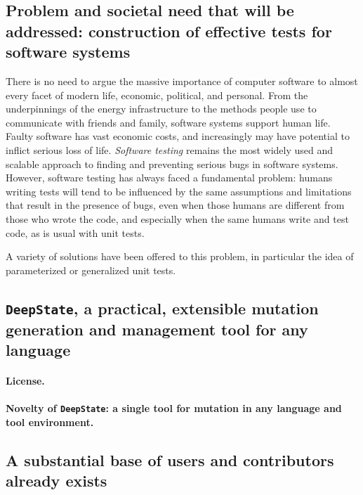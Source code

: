 \documentclass[numbers]{proposalnsf}
\newcommand{\ds}{\texttt{DeepState}}
\begin{document}
\vspace{-2mm}\subsection{Problem and societal need that will be addressed: construction of effective tests for software systems}

There is no need to argue the massive importance of computer software to almost every facet of modern life, economic, political, and personal.  From the underpinnings of the energy infrastructure to the methods people use to communicate with friends and family, software systems support human life.  Faulty software has vast economic costs, and increasingly may have potential to inflict serious loss of life.  \emph{Software testing} remains the most widely used and scalable approach to finding and preventing serious bugs in software systems.  However, software testing has always faced a fundamental problem: humans writing tests will tend to be influenced by the same assumptions and limitations that result in the presence of bugs, even when those humans are different from those who wrote the code, and especially when the same humans write and test code, as is usual with unit tests.

A variety of solutions have been offered to this problem, in particular the idea of parameterized or generalized unit tests.  


\subsection{\ds,  a practical, extensible mutation generation and management tool for any language}



\paragraph{License.}

\paragraph{Novelty of \ds: a single tool for mutation in any language and tool environment.}



\subsection{A substantial base of users and contributors already exists}
\end{document}
